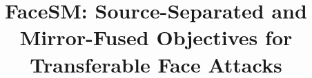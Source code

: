 \documentclass[a4paper,fleqn]{cas-dc}
\begin{document}
\let\WriteBookmarks\relax
\def\floatpagepagefraction{1}
\def\textpagefraction{.001}



\title [mode = title]{FaceSM: Source-Separated and Mirror-Fused Objectives for Transferable Face Attacks}  



%













\end{document}
